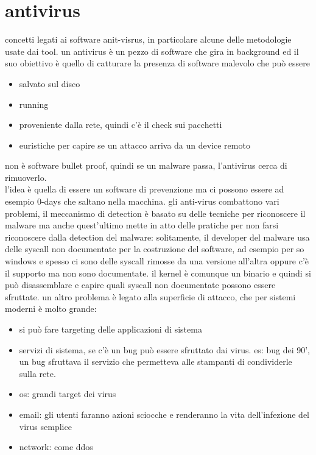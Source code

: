 \documentclass[12pt, oneside]{extbook} %
\begin{document}
\chapter{antivirus}
concetti legati ai software anit-visrus, in particolare alcune delle metodologie usate dai tool. un antivirus è un pezzo di software che gira in background ed il suo obiettivo è quello di catturare la presenza di software malevolo che può essere
\begin{itemize}
\item salvato sul disco
\item running
\item proveniente dalla rete, quindi c'è il check sui pacchetti
\item euristiche per capire se un attacco arriva da un device remoto
\end{itemize}
non è software bullet proof, quindi se un malware passa, l'antivirus cerca di rimuoverlo.\\l'idea è quella di essere un software di prevenzione ma ci possono essere ad esempio 0-days che saltano nella macchina. gli anti-virus combattono vari problemi, il meccanismo di detection è basato su delle tecniche per riconoscere il malware ma anche quest'ultimo mette in atto delle pratiche per non farsi riconoscere dalla detection del malware: solitamente, il developer del malware usa delle syscall non documentate per la costruzione del software, ad esempio per so windows e spesso ci sono delle syscall rimosse da una versione all'altra oppure c'è il supporto ma non sono documentate. il kernel è comunque un binario e quindi si può disassemblare e capire quali syscall non documentate possono essere sfruttate. un altro problema è legato alla superficie di attacco, che per sistemi moderni è molto grande:
\begin{itemize}
\item si può fare targeting delle applicazioni di sistema
\item servizi di sistema, se c'è un bug può essere sfruttato dai virus. es: bug dei 90', un bug sfruttava il servizio che permetteva alle stampanti di condividerle sulla rete.
\item os: grandi target dei virus
\item email: gli utenti faranno azioni sciocche e renderanno la vita dell'infezione del virus semplice
\item network: come ddos
\end{itemize}
\end{document}
